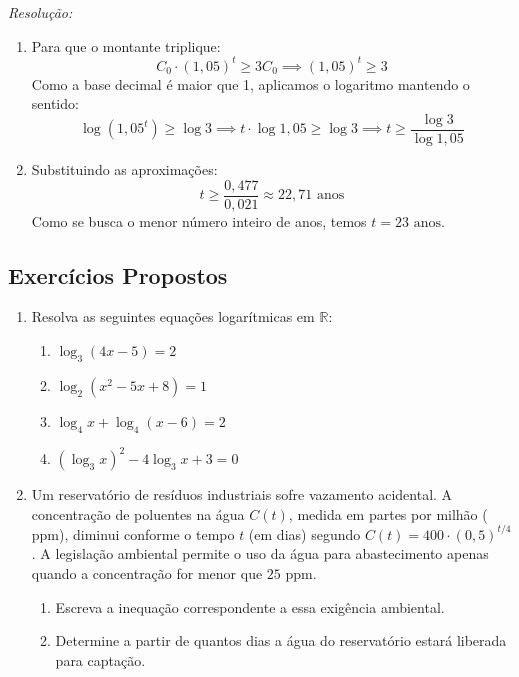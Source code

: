 \documentclass[12pt,a4paper]{report}
\begin{document}
	\textit{Resolução:}
	\begin{enumerate}[label=\textbf{\alph*)}]
		\item Para que o montante triplique:
		$$C_0 \cdot (1{,}05)^t \geqslant 3 C_0 \implies (1{,}05)^t \geqslant 3$$
		Como a base decimal é maior que 1, aplicamos o logaritmo mantendo o sentido:
		$$\log(1{,}05^t) \geqslant \log 3 \implies t \cdot \log 1{,}05 \geqslant \log 3 \implies t \geqslant \frac{\log 3}{\log 1{,}05}$$
		
		\item Substituindo as aproximações:
		$$t \geqslant \frac{0{,}477}{0{,}021} \approx 22{,}71\text{ anos}$$
		Como se busca o menor número inteiro de anos, temos $t = 23\text{ anos}$.
	\end{enumerate}
	
	\newpage
	
	\subsection*{Exercícios Propostos}
	
	\begin{enumerate}
		\item Resolva as seguintes equações logarítmicas em $\mathbb{R}$:
		\begin{enumerate}[label=\textbf{\alph*)}]
			\item $\log_3 (4x - 5) = 2$
			\item $\log_2 (x^2 - 5x + 8) = 1$
			\item $\log_4 x + \log_4 (x - 6) = 2$
			\item $(\log_3 x)^2 - 4\log_3 x + 3 = 0$
		\end{enumerate}
		
		\item Um reservatório de resíduos industriais sofre vazamento acidental. A concentração de poluentes na água $C(t)$, medida em partes por milhão ($\text{ppm}$), diminui conforme o tempo $t$ (em dias) segundo $C(t) = 400 \cdot (0{,}5)^{t/4}$. A legislação ambiental permite o uso da água para abastecimento apenas quando a concentração for menor que $25\text{ ppm}$.
		\begin{enumerate}[label=\textbf{\alph*)}]
			\item Escreva a inequação correspondente a essa exigência ambiental.
			\item Determine a partir de quantos dias a água do reservatório estará liberada para captação.
		\end{enumerate}
	\end{enumerate}
\end{document}
